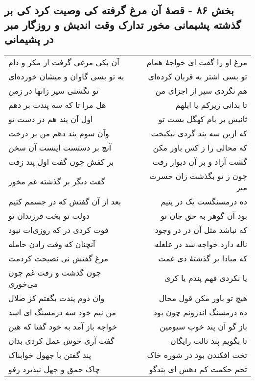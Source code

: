 \begin{center}
\section*{بخش ۸۶ - قصهٔ آن مرغ گرفته کی وصیت کرد کی بر گذشته پشیمانی مخور تدارک وقت اندیش و روزگار مبر در پشیمانی}
\label{sec:sh086}
\begin{longtable}{l p{0.5cm} r}
آن یکی مرغی گرفت از مکر و دام
&&
مرغ او را گفت ای خواجهٔ همام
\\
به تو بسی گاوان و میشان خورده‌ای
&&
تو بسی اشتر به قربان کرده‌ای
\\
تو نگشتی سیر زانها در زمن
&&
هم نگردی سیر از اجزای من
\\
هل مرا تا که سه پندت بر دهم
&&
تا بدانی زیرکم یا ابلهم
\\
اول آن پند هم در دست تو
&&
ثانیش بر بام کهگل بست تو
\\
وآن سوم پند دهم من بر درخت
&&
که ازین سه پند گردی نیکبخت
\\
آنچ بر دستست اینست آن سخن
&&
که محالی را ز کس باور مکن
\\
بر کفش چون گفت اول پند زفت
&&
گشت آزاد و بر آن دیوار رفت
\\
گفت دیگر بر گذشته غم مخور
&&
چون ز تو بگذشت زان حسرت مبر
\\
بعد از آن گفتش که در جسمم کتیم
&&
ده درمسنگست یک در یتیم
\\
دولت تو بخت فرزندان تو
&&
بود آن گوهر به حق جان تو
\\
فوت کردی در که روزی‌ات نبود
&&
که نباشد مثل آن در در وجود
\\
آنچنان که وقت زادن حامله
&&
ناله دارد خواجه شد در غلغله
\\
مرغ گفتش نی نصیحت کردمت
&&
که مبادا بر گذشتهٔ دی غمت
\\
چون گذشت و رفت غم چون می‌خوری
&&
یا نکردی فهم پندم یا کری
\\
وان دوم پندت بگفتم کز ضلال
&&
هیچ تو باور مکن قول محال
\\
من نیم خود سه درمسنگ ای اسد
&&
ده درمسنگ اندرونم چون بود
\\
خواجه باز آمد به خود گفتا که هین
&&
باز گو آن پند خوب سیومین
\\
گفت آری خوش عمل کردی بدان
&&
تا بگویم پند ثالث رایگان
\\
پند گفتن با جهول خوابناک
&&
تخت افکندن بود در شوره خاک
\\
چاک حمق و جهل نپذیرد رفو
&&
تخم حکمت کم دهش ای پندگو
\\
\end{longtable}
\end{center}
